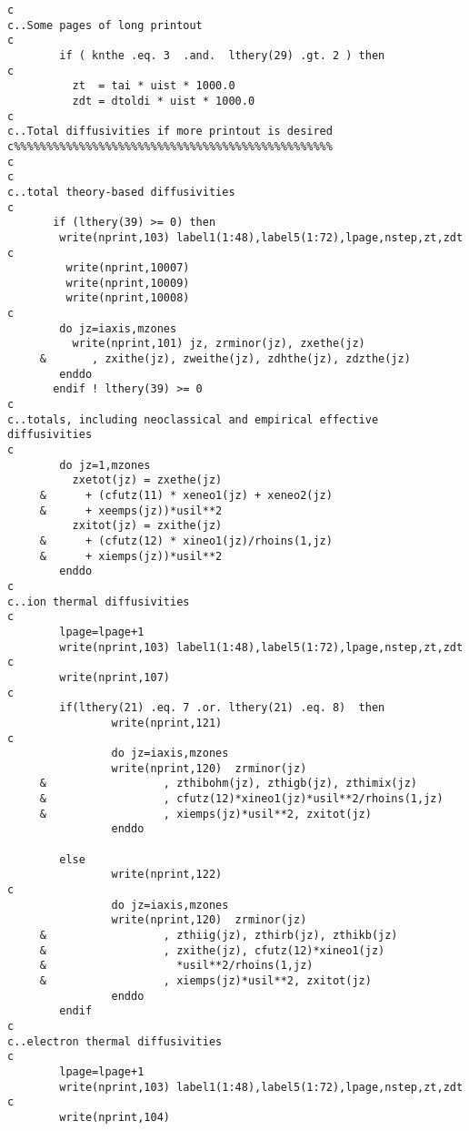 \begin{verbatim}
c
c..Some pages of long printout
c
        if ( knthe .eq. 3  .and.  lthery(29) .gt. 2 ) then
c
          zt  = tai * uist * 1000.0
          zdt = dtoldi * uist * 1000.0
c
c..Total diffusivities if more printout is desired
c%%%%%%%%%%%%%%%%%%%%%%%%%%%%%%%%%%%%%%%%%%%%%%%%%
c
c
c..total theory-based diffusivities
c
       if (lthery(39) >= 0) then
        write(nprint,103) label1(1:48),label5(1:72),lpage,nstep,zt,zdt
c
         write(nprint,10007)
         write(nprint,10009)
         write(nprint,10008)
c
        do jz=iaxis,mzones
          write(nprint,101) jz, zrminor(jz), zxethe(jz)
     &       , zxithe(jz), zweithe(jz), zdhthe(jz), zdzthe(jz)
        enddo
       endif ! lthery(39) >= 0
c
c..totals, including neoclassical and empirical effective diffusivities
c
        do jz=1,mzones
          zxetot(jz) = zxethe(jz)
     &      + (cfutz(11) * xeneo1(jz) + xeneo2(jz)
     &      + xeemps(jz))*usil**2
          zxitot(jz) = zxithe(jz)
     &      + (cfutz(12) * xineo1(jz)/rhoins(1,jz)
     &      + xiemps(jz))*usil**2
        enddo
c
c..ion thermal diffusivities
c
        lpage=lpage+1
        write(nprint,103) label1(1:48),label5(1:72),lpage,nstep,zt,zdt
c
        write(nprint,107)
c
        if(lthery(21) .eq. 7 .or. lthery(21) .eq. 8)  then
                write(nprint,121)
c
                do jz=iaxis,mzones
                write(nprint,120)  zrminor(jz)
     &                  , zthibohm(jz), zthigb(jz), zthimix(jz)
     &                  , cfutz(12)*xineo1(jz)*usil**2/rhoins(1,jz)
     &                  , xiemps(jz)*usil**2, zxitot(jz)
                enddo

        else
                write(nprint,122)
c
                do jz=iaxis,mzones
                write(nprint,120)  zrminor(jz)
     &                  , zthiig(jz), zthirb(jz), zthikb(jz)
     &                  , zxithe(jz), cfutz(12)*xineo1(jz)
     &                    *usil**2/rhoins(1,jz)
     &                  , xiemps(jz)*usil**2, zxitot(jz)
                enddo
        endif
c
c..electron thermal diffusivities
c
        lpage=lpage+1
        write(nprint,103) label1(1:48),label5(1:72),lpage,nstep,zt,zdt
c
        write(nprint,104)


\end{verbatim}

